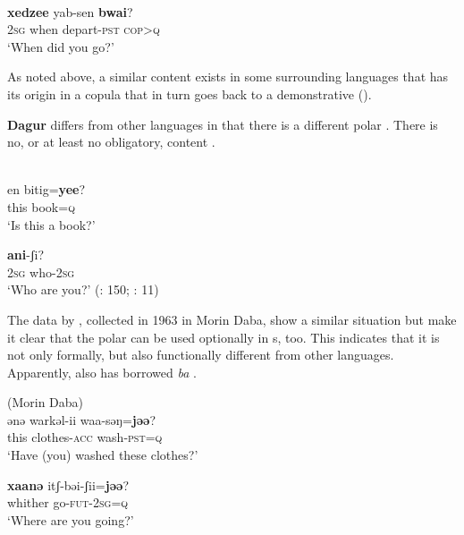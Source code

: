 \ea%
    \label{ex:mong:7}
    \\
     \textbf{{xedzee}} {yab-sen} \textbf{{bwai}}?\\
    2\textsc{sg}  when  depart-\textsc{pst}  \textsc{cop}>\textsc{q}\\
    \glt ‘When did you go?’ \citep[255]{Janhunen2012c}
    \z

\noindent As noted above, a similar content  exists in some surrounding  languages that has its origin in a copula that in turn goes back to a demonstrative ().

\textbf{Dagur} differs from other  languages in that there is a different polar . There is no, or at least no obligatory, content .

\ea%
    \label{ex:mong:8}
    \\
    \ea
    \gll en  bitig=\textbf{{yee}}?\\
    this  book=\textsc{q}\\
    \glt ‘Is this a book?’
    
    \ex
     \textbf{{ani}}{-ʃi?}\\
    2\textsc{sg}  who-2\textsc{sg}\\
    \glt ‘Who are you?’ (\citealt{Tsumagari2003}: 150; \citealt{Chaolu1994c}: 11)
    \z
    \z

The data by \citet{ZhongSuchun1982}, collected in 1963 in Morin Daba, show a similar situation but make it clear that the polar  can be used optionally in s, too. This indicates that it is not only formally, but also functionally different from other  languages. Apparently,  also has borrowed  \textit{ba} .

\ea%
    \label{ex:mong:9}
     (Morin Daba)\\
    \ea
    \gll ənə  warkəl-ii  waa-səŋ=\textbf{{jəə}}?\\
    this  clothes-\textsc{acc}  wash-\textsc{pst}=\textsc{q}\\
    \glt ‘Have (you) washed these clothes?’
    
    \ex
    \gll \textbf{{xaanə}} {itʃ-bəi-ʃii=}\textbf{{jəə}}?\\
    whither  go-\textsc{fut}-2\textsc{sg}=\textsc{q}\\
    \glt ‘Where are you going?’
    
